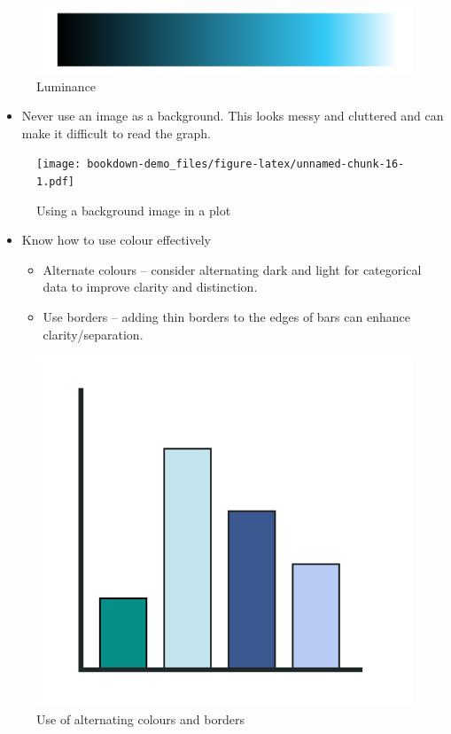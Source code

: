 \documentclass[
]{book}
\providecommand{\tightlist}{%
  \setlength{\itemsep}{0pt}\setlength{\parskip}{0pt}}
\begin{document}
\begin{figure}
\includegraphics[width=1\linewidth]{img/visegs/eglum} \caption{Luminance}\label{fig:unnamed-chunk-15}
\end{figure}

\begin{itemize}
\tightlist
\item
  Never use an image as a background. This looks messy and cluttered and can make it difficult to read the graph.
\end{itemize}

\begin{figure}
\centering
\texttt{[image: bookdown-demo\_files/figure-latex/unnamed-chunk-16-1.pdf]}
\caption{\label{fig:unnamed-chunk-16}Using a background image in a plot}
\end{figure}

\begin{itemize}
\item
  Know how to use colour effectively

  \begin{itemize}
  \tightlist
  \item
    Alternate colours -- consider alternating dark and light for categorical data to improve clarity and distinction.
  \item
    Use borders -- adding thin borders to the edges of bars can enhance clarity/separation.
  \end{itemize}
\end{itemize}

\begin{figure}
\includegraphics[width=1\linewidth]{img/visegs/egcolsgoodpractice} \caption{Use of alternating colours and borders}\label{fig:unnamed-chunk-17}
\end{figure}
\end{document}
